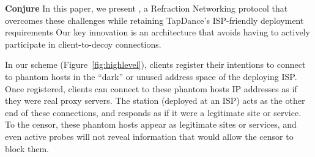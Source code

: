\documentclass[sigconf]{acmart}
\newcommand{\TODO}[1]{}
\renewcommand{\TODO}[1]{{\color{red} TODO: {#1}}}
\begin{document}



\smallskip
\noindent\textbf{Conjure}\enskip
In this paper, we present \scheme, a Refraction
Networking protocol that overcomes these challenges while retaining
TapDance's ISP-friendly deployment requirements
Our key innovation is an architecture that avoids
having to actively participate in client-to-decoy connections.

In our scheme (Figure~\ref{fig:highlevel}), clients
register their intentions to connect to phantom hosts in the ``dark''
or unused address space of the deploying ISP. Once registered, clients
can connect to these phantom hosts IP addresses as if they were real
proxy servers. The \scheme station (deployed at an ISP) acts as the other end of these connections, and
responds as if it were a legitimate site or service. To the censor,
these phantom hosts appear as legitimate sites or services, and even
active probes will not reveal information that would allow the censor to
block them.


\end{document}
